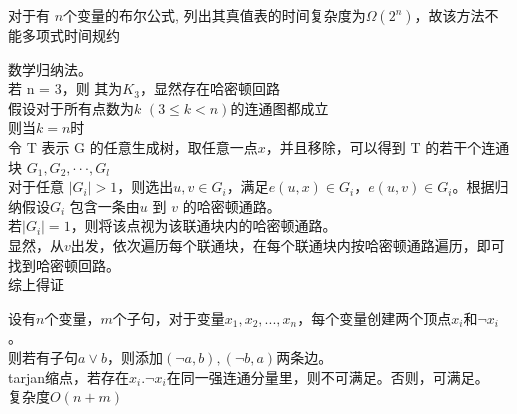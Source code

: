 \documentclass[a4paper, justified]{tufte-handout}
\begin{document}
\begin{solution}
对于有 $n$个变量的布尔公式, 列出其真值表的时间复杂度为$\Omega(2^n)$，故该方法不能多项式时间规约
\end{solution}

\begin{problem}[TC 34.2-11]
\end{problem}

\begin{solution}
数学归纳法。\\
若 n = 3，则 其为$K_3$，显然存在哈密顿回路\\
假设对于所有点数为$k$ $(3 \leq k < n)$的连通图都成立\\
则当$k=n$时\\
令 T 表示 G 的任意生成树，取任意一点$x$，并且移除，可以得到 T 的若干个连通块 $G_1, G_2, · · · , G_l$\\
对于任意 $|G_i|>1$，则选出$u, v\in G_i$，满足$e(u,x)\in G_i$，$e(u,v)\in G_i$。根据归纳假设$G_i$ 包含一条由$u$ 到 $v$ 的哈密顿通路。\\
若$|G_i|=1$，则将该点视为该联通块内的哈密顿通路。\\
显然，从$v$出发，依次遍历每个联通块，在每个联通块内按哈密顿通路遍历，即可找到哈密顿回路。\\
综上得证
\end{solution}

\begin{problem}[TC 34.4-7]
\end{problem}

\begin{solution}
设有$n$个变量，$m$个子句，对于变量$x_1,x_2,...,x_n$，每个变量创建两个顶点$x_i$和$\neg x_i$。\\
则若有子句$a\lor b$，则添加$ (\neg a, b),(\neg b, a)$两条边。\\
tarjan缩点，若存在$x_i.\neg x_i$在同一强连通分量里，则不可满足。否则，可满足。\\
复杂度$O(n+m)$
\end{solution}

\begin{problem}[TC 34.5-6]
\end{problem}
\end{document}
